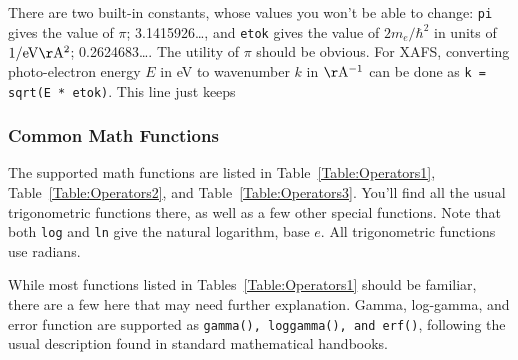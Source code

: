 There are two built-in constants, whose values you won't be able to change:
{\texttt{pi}} gives the value of $\pi$; 3.1415926\ldots, and
{\texttt{etok}} gives the value of $2m_e/\hbar^2$ in units of $\rm 1/
eV\AA^2$; 0.2624683\ldots.  The utility of $\pi$ should be obvious.  For
XAFS, converting photo-electron energy $E$ in eV to wavenumber $k$ in
$\rm\AA^{-1}$ can be done as {\tt {k = sqrt(E * etok)}}. This line just
keeps 


\subsubsection{Common Math Functions}

The supported math functions are listed in Table~{\ref{Table:Operators1}},
Table~{\ref{Table:Operators2}}, and Table~{\ref{Table:Operators3}}.  You'll
find all the usual trigonometric functions there, as well as a few other
special functions.  Note that both {\texttt{log}} and {\texttt{ln}} give
the natural logarithm, base $e$.  All trigonometric functions use radians.

While most functions listed in Tables~{\ref{Table:Operators1}} should be
familiar, there are a few here that may need further explanation.  Gamma,
log-gamma, and error function are supported as {\texttt{gamma(),
    loggamma(), {\rm{and}} erf()}}, following the usual description found
in standard mathematical handbooks.


